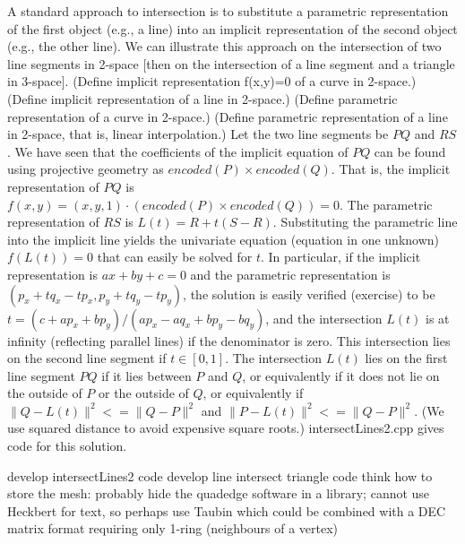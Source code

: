 \documentclass[11pt]{article}
\begin{document}
A standard approach to intersection is to substitute a parametric representation
of the first object (e.g., a line) into an implicit representation of the second
object (e.g., the other line).
We can illustrate this approach on the intersection of two line segments in 2-space
[then on the intersection of a line segment and a triangle in 3-space].
(Define implicit representation f(x,y)=0 of a curve in 2-space.)
(Define implicit representation of a line in 2-space.)
(Define parametric representation of a curve in 2-space.)
(Define parametric representation of a line in 2-space, that is, linear interpolation.)
Let the two line segments be $PQ$ and $RS$.
We have seen that the coefficients of the implicit equation of $PQ$
can be found using projective geometry as $encoded(P) \times encoded(Q)$.
That is, the implicit representation of $PQ$ is $f(x,y) = (x,y,1) \cdot (encoded(P) \times encoded(Q)) = 0$.
The parametric representation of $RS$ is $L(t) = R + t(S-R)$.
Substituting the parametric line into the implicit line
yields the univariate equation (equation in one unknown) $f(L(t))=0$ that can easily be solved for $t$.
In particular, if the implicit representation is $ax+by+c=0$ and the parametric representation
is $(p_x + tq_x - tp_x, p_y + tq_y - tp_y)$, the solution is easily verified (exercise) to be
$t = (c+ap_x + bp_y) / (ap_x - aq_x + bp_y - bq_y)$, and the intersection $L(t)$ is at infinity
(reflecting parallel lines) if the denominator is zero.
This intersection lies on the second line segment if $t \in [0,1]$.
The intersection $L(t)$ lies on the first line segment $PQ$ if it lies between $P$ and $Q$,
or equivalently if it does not lie on the outside of $P$ or the outside of $Q$, 
or equivalently if $\|Q - L(t)\|^2 <= \|Q - P\|^2$ and $\|P - L(t)\|^2 <= \|Q - P\|^2$.
(We use squared distance to avoid expensive square roots.)
intersectLines2.cpp gives code for this solution.

develop intersectLines2 code
develop line intersect triangle code
think how to store the mesh: probably hide the quadedge software in a library;
cannot use Heckbert for text, so perhaps use Taubin which could be combined with a DEC matrix format requiring
only 1-ring (neighbours of a vertex)
\end{document}
